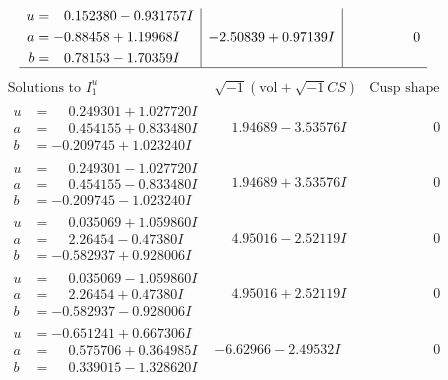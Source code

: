 \documentclass[1p]{elsarticle_modified}
\theoremstyle{definition}
\newcommand{\I}{\sqrt{-1}}
\begin{document}
$$\begin{array}{c|c|c}
\begin{aligned}
u &= \phantom{-}0.152380 - 0.931757 I \\
a &= -0.88458 + 1.19968 I \\
b &= \phantom{-}0.78153 - 1.70359 I\end{aligned}
 & -2.50839 + 0.97139 I & \phantom{-0.000000 } 0\\
 \hline 
 \end{array}$$\newpage$$\begin{array}{c|c|c}  
\text{Solutions to }I^u_{1}& \I (\text{vol} + \sqrt{-1}CS) & \text{Cusp shape}\\
 \hline 
\begin{aligned}
u &= \phantom{-}0.249301 + 1.027720 I \\
a &= \phantom{-}0.454155 + 0.833480 I \\
b &= -0.209745 + 1.023240 I\end{aligned}
 & \phantom{-}1.94689 - 3.53576 I & \phantom{-0.000000 } 0 \\ \hline\begin{aligned}
u &= \phantom{-}0.249301 - 1.027720 I \\
a &= \phantom{-}0.454155 - 0.833480 I \\
b &= -0.209745 - 1.023240 I\end{aligned}
 & \phantom{-}1.94689 + 3.53576 I & \phantom{-0.000000 } 0 \\ \hline\begin{aligned}
u &= \phantom{-}0.035069 + 1.059860 I \\
a &= \phantom{-}2.26454 - 0.47380 I \\
b &= -0.582937 + 0.928006 I\end{aligned}
 & \phantom{-}4.95016 - 2.52119 I & \phantom{-0.000000 } 0 \\ \hline\begin{aligned}
u &= \phantom{-}0.035069 - 1.059860 I \\
a &= \phantom{-}2.26454 + 0.47380 I \\
b &= -0.582937 - 0.928006 I\end{aligned}
 & \phantom{-}4.95016 + 2.52119 I & \phantom{-0.000000 } 0 \\ \hline\begin{aligned}
u &= -0.651241 + 0.667306 I \\
a &= \phantom{-}0.575706 + 0.364985 I \\
b &= \phantom{-}0.339015 - 1.328620 I\end{aligned}
 & -6.62966 - 2.49532 I & \phantom{-0.000000 } 0 \\ \hline\begin{aligned}

\end{aligned}
\end{array}$$
\end{document}
